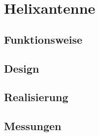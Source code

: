 \chapter{Helixantenne}

\section{Funktionsweise}

\section{Design}

\section{Realisierung}

\section{Messungen}


